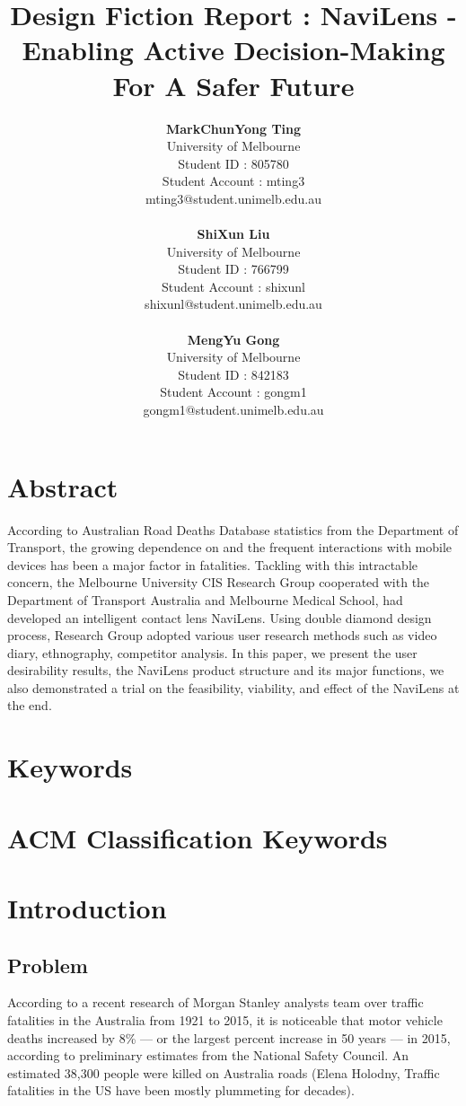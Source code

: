 \documentclass{chi-ext}
\title{Design Fiction Report : NaviLens - Enabling Active Decision-Making For A Safer Future}
\author{
  \textbf{MarkChunYong Ting} \\
  University of Melbourne \\
  Student ID : 805780 \\
  Student Account : mting3 \\
  mting3@student.unimelb.edu.au \\
  \\
  \textbf{ShiXun Liu} \\
  University of Melbourne \\
  Student ID : 766799 \\
  Student Account : shixunl \\
  shixunl@student.unimelb.edu.au \\
  \\
  \textbf{MengYu Gong} \\
  University of Melbourne \\
  Student ID : 842183 \\
  Student Account : gongm1 \\
  gongm1@student.unimelb.edu.au \\
}
\begin{document}
\maketitle

\begin{multicols}{2}
  
\makeauthors
\makecopyright

\section{Abstract}

According to Australian Road Deaths Database statistics from the Department of Transport,  the growing dependence on and the frequent interactions with mobile devices has been a major factor in fatalities. Tackling with this intractable concern, the Melbourne University CIS Research Group cooperated with the Department of Transport Australia and Melbourne Medical School, had developed an intelligent contact lens NaviLens. Using double diamond design process, Research Group adopted various user research methods such as video diary, ethnography, competitor analysis. In this paper, we present the user desirability results, the NaviLens product structure and its major functions, we also demonstrated a trial on the feasibility, viability, and effect of the NaviLens at the end.\\


\section{Keywords}
\makeatletter \@keywords \makeatother

\section{ACM Classification Keywords}
\makeatletter \@acmclassification \makeatother


\section{Introduction}

\subsection{Problem}
According to a recent research of Morgan Stanley analysts team over traffic fatalities in the Australia from 1921 to 2015, it is noticeable that motor vehicle deaths increased by 8\% --- or the largest percent increase in 50 years --- in 2015, according to preliminary estimates from the National Safety Council. An estimated 38,300 people were killed on Australia roads (Elena Holodny, Traffic fatalities in the US have been mostly plummeting for decades).\\


\end{multicols}
\end{document}
